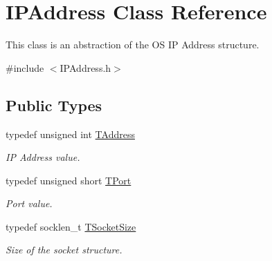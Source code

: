 \hypertarget{class_i_p_address}{\section{I\-P\-Address Class Reference}
\label{class_i_p_address}
}


This class is an abstraction of the O\-S I\-P Address structure.  




{\ttfamily \#include $<$I\-P\-Address.\-h$>$}

\subsection*{Public Types}
\begin{DoxyCompactItemize}
\item 
typedef unsigned int \hyperlink{class_i_p_address_a36831f63346275f44e8747d77a2a5d51}{T\-Address}
\begin{DoxyCompactList}\small\item\em I\-P Address value. \end{DoxyCompactList}\item 
typedef unsigned short \hyperlink{class_i_p_address_a51188195685c31d4258c0a078cc37154}{T\-Port}
\begin{DoxyCompactList}\small\item\em Port value. \end{DoxyCompactList}\item 
typedef socklen\-\_\-t \hyperlink{class_i_p_address_a28c76ca7e5d4aa86d2caf0b742a23cdb}{T\-Socket\-Size}
\begin{DoxyCompactList}\small\item\em Size of the socket structure. \end{DoxyCompactList}\end{DoxyCompactItemize}
